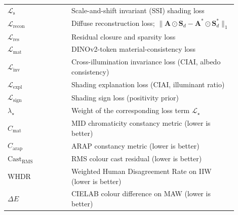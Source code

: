 \begin{longtable}{p{0.25\linewidth} p{0.65\linewidth}}
$\mathcal{L}_{\text{s}}$
  & Scale-and-shift invariant (SSI) shading loss \\

$\mathcal{L}_{\text{recon}}$
  & Diffuse reconstruction loss; $\|\mathbf{A} \odot \mathbf{S}_d - \mathbf{A}^* \odot \mathbf{S}^*_d\|_1$ \\

$\mathcal{L}_{\text{res}}$
  & Residual closure and sparsity loss \\

$\mathcal{L}_{\text{mat}}$
  & DINOv2-token material-consistency loss \\

$\mathcal{L}_{\text{inv}}$
  & Cross-illumination invariance loss (CIAI, albedo consistency) \\

$\mathcal{L}_{\text{expl}}$
  & Shading explanation loss (CIAI, illuminant ratio) \\

$\mathcal{L}_{\text{sign}}$
  & Shading sign loss (positivity prior) \\

$\lambda_{\star}$
  & Weight of the corresponding loss term $\mathcal{L}_{\star}$ \\

$C_{\text{mat}}$
  & MID chromaticity constancy metric (lower is better) \\

$C_{\text{arap}}$
  & ARAP constancy metric (lower is better) \\

$\text{Cast}_{\text{RMS}}$
  & RMS colour cast residual (lower is better) \\

$\text{WHDR}$
  & Weighted Human Disagreement Rate on IIW (lower is better) \\

$\Delta E$
  & CIELAB colour difference on MAW (lower is better) \\

\end{longtable}
